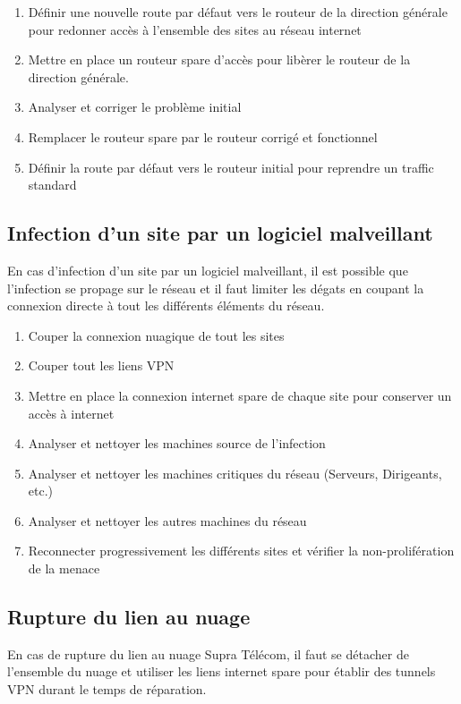 \documentclass{article}
\newcommand{\spr}{Supra Télécom\xspace}
\begin{document}
\begin{enumerate}
  \item Définir une nouvelle route par défaut vers le routeur de la direction générale pour redonner accès à l'ensemble des sites au réseau internet
  \item Mettre en place un routeur spare d'accès pour libèrer le routeur de la direction générale.
  \item Analyser et corriger le problème initial
  \item Remplacer le routeur spare par le routeur corrigé et fonctionnel
  \item Définir la route par défaut vers le routeur initial pour reprendre un traffic standard
\end{enumerate}

\subsection{Infection d'un site par un logiciel malveillant}

En cas d'infection d'un site par un logiciel malveillant, il est possible que l'infection se propage sur le réseau et il faut limiter les dégats en coupant la connexion directe à tout les différents éléments du réseau.

\bigskip

\begin{enumerate}
  \item Couper la connexion nuagique de tout les sites
  \item Couper tout les liens VPN
  \item Mettre en place la connexion internet spare de chaque site pour conserver un accès à internet
  \item Analyser et nettoyer les machines source de l'infection
  \item Analyser et nettoyer les machines critiques du réseau (Serveurs, Dirigeants, etc.)
  \item Analyser et nettoyer les autres machines du réseau
  \item Reconnecter progressivement les différents sites et vérifier la non-prolifération de la menace
\end{enumerate}

\subsection{Rupture du lien au nuage}

En cas de rupture du lien au nuage \spr, il faut se détacher de l'ensemble du nuage et utiliser les liens internet spare pour établir des tunnels VPN durant le temps de réparation.
\end{document}
